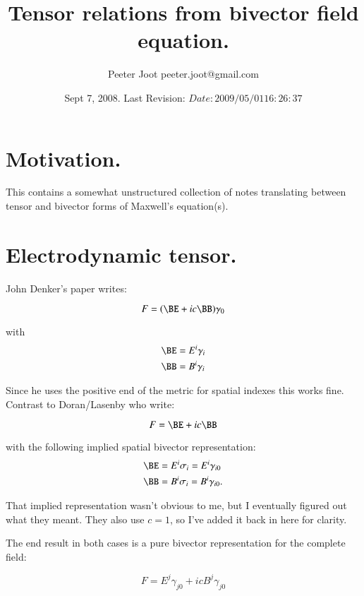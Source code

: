 \documentclass{article}
\title{ Tensor relations from bivector field equation. }
\author{Peeter Joot \quad peeter.joot@gmail.com}
\date{ Sept 7, 2008.  Last Revision: $Date: 2009/05/01 16:26:37 $ }
\begin{document}
\maketitle{}

\tableofcontents

\section{ Motivation. }

This contains a somewhat unstructured collection of notes translating between tensor and bivector forms of Maxwell's equation(s).

\section{ Electrodynamic tensor. }

John Denker's paper \cite{DenkerMaxwell} writes:

\begin{equation}
F = (\BE + ic\BB) \gamma_0
\end{equation}

with
\begin{align*}
\BE &= E^i \gamma_i \\
\BB &= B^i \gamma_i
\end{align*}

Since he uses the positive end of the metric for spatial indexes this works fine.  Contrast to Doran/Lasenby who write:

\begin{equation}
F = \BE + ic\BB
\end{equation}

with the following implied spatial bivector representation:
\begin{align*}
\BE &= E^i \sigma_i = E^i \gamma_{i0} \\
\BB &= B^i \sigma_i = B^i \gamma_{i0}.
\end{align*}

That implied representation wasn't obvious to me, but I eventually figured out what they meant.  They also use $c=1$, so I've added it back in here for clarity.

The end result in both cases is a pure bivector representation for the complete field:

\begin{equation*}
F = E^j \gamma_{j0} + ic B^j \gamma_{j0}
\end{equation*}

\end{document}
